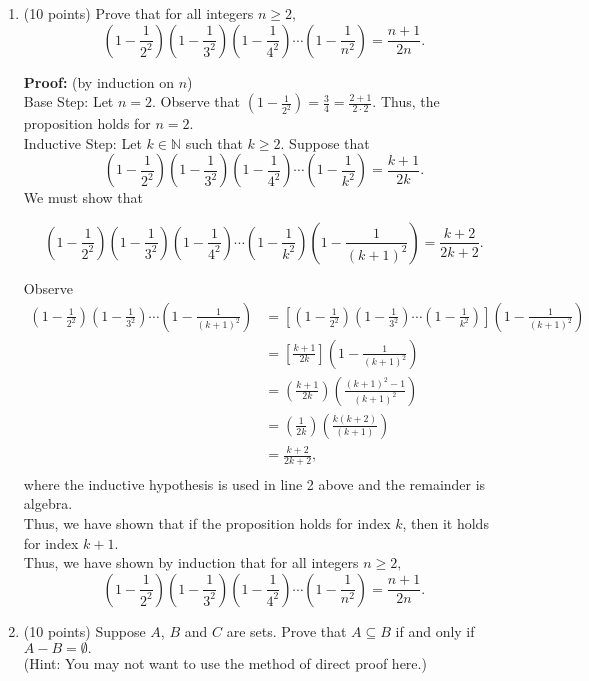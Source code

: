 \documentclass[11pt]{article}
\begin{document}
\begin{enumerate}
\item (10 points) Prove that for all integers $n\geq 2,$ 
$$\left(1-\frac{1}{2^2} \right)\left( 1-\frac{1}{3^2} \right)\left( 1-\frac{1}{4^2} \right)\cdots\left(1-\frac{1}{n^2}  \right) =\frac{n+1}{2n}.$$


\textbf{Proof:} (by induction on $n$) \\
Base Step: Let $n=2.$ Observe that $\left(1-\frac{1}{2^2} \right)=\frac{3}{4} = \frac{2+1}{2\cdot 2}.$ Thus, the proposition holds for $n=2.$\\

Inductive Step: Let $k \in \mathbb{N}$ such that $k \geq 2.$ Suppose that  $$\left(1-\frac{1}{2^2} \right)\left( 1-\frac{1}{3^2} \right)\left( 1-\frac{1}{4^2} \right)\cdots\left(1-\frac{1}{k^2}  \right) =\frac{k+1}{2k}.$$ We must show that 

$$\left(1-\frac{1}{2^2} \right)\left( 1-\frac{1}{3^2} \right)\left( 1-\frac{1}{4^2} \right)\cdots\left(1-\frac{1}{k^2}  \right)\left(1-\frac{1}{(k+1)^2}  \right) =\frac{k+2}{2k+2}.$$

Observe \\
\begin{align*}
\left(1-\frac{1}{2^2} \right)\left( 1-\frac{1}{3^2} \right)\cdots\left(1-\frac{1}{(k+1)^2}  \right)&=\left[\left(1-\frac{1}{2^2} \right)\left( 1-\frac{1}{3^2} \right)\cdots\left(1-\frac{1}{k^2}  \right)\right]\left(1-\frac{1}{(k+1)^2}  \right)\\
&=\left[ \frac{k+1}{2k} \right]\left(1-\frac{1}{(k+1)^2}  \right)\\
&=\left( \frac{k+1}{2k} \right)\left(\frac{(k+1)^2-1}{(k+1)^2}  \right)\\
&=\left( \frac{1}{2k} \right)\left(\frac{k(k+2)}{(k+1)}  \right)\\
&=\frac{k+2}{2k+2} ,\\
\end{align*}
where the inductive hypothesis is used in line 2 above and the remainder is algebra.\\
Thus, we have shown that if the proposition holds for index $k$, then it holds for index $k+1.$\\

Thus, we have shown by induction that for all integers $n\geq 2,$ 
$$\left(1-\frac{1}{2^2} \right)\left( 1-\frac{1}{3^2} \right)\left( 1-\frac{1}{4^2} \right)\cdots\left(1-\frac{1}{n^2}  \right) =\frac{n+1}{2n}.$$

\newpage
\item (10 points) Suppose $A$, $B$ and $C$ are sets. Prove that $A \subseteq B$ if and only if $A-B=\emptyset.$\\
(Hint: You may not want to use the method of direct proof here.)\\


\end{enumerate}
\end{document}

